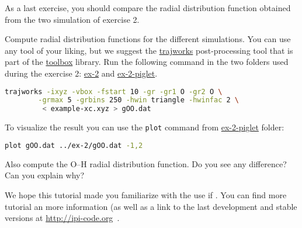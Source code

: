 \documentclass{article}
\begin{document}
\begin{Exercise}[label={inputs},title={Radial distribution function comparison}]
As a last exercise, you should compare the radial distribution
function obtained from the two simulation of exercise 2.

\Question
Compute radial distribution functions for the different simulations. You
can use any tool of your liking, but we suggest the \url{trajworks} 
post-processing tool that is part of the \url{toolbox} library.
Run the following command in the two folders used during the exercise
2: \url{ex-2} and \url{ex-2-piglet}.
\begin{lstlisting}[language=bash]
trajworks -ixyz -vbox -fstart 10 -gr -gr1 O -gr2 O \
        -grmax 5 -grbins 250 -hwin triangle -hwinfac 2 \
         < example-xc.xyz > gOO.dat
\end{lstlisting}

To visualize the result you can use the \texttt{plot} command from
\url{ex-2-piglet} folder:
\begin{lstlisting}[language=bash]
plot gOO.dat ../ex-2/gOO.dat -1,2
\end{lstlisting}
Also compute the O--H radial distribution function.
Do you see any difference? Can you explain why?

\end{Exercise}

We hope this tutorial made you familiarize with the use if \ipi. You
can find more tutorial an more information (as well as a link to the
last development and stable versions at \url{http://ipi-code.org}~\cite{CP2K}.




\end{document}
